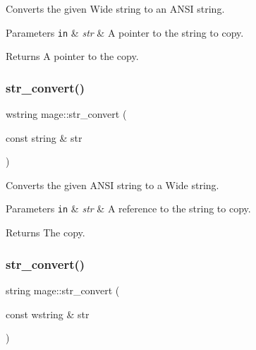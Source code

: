 Converts the given Wide string to an A\+N\+SI string.


\begin{DoxyParams}[1]{Parameters}
\mbox{\tt in}  & {\em str} & A pointer to the string to copy. \\
\hline
\end{DoxyParams}
\begin{DoxyReturn}{Returns}
A pointer to the copy. 
\end{DoxyReturn}
\hypertarget{namespacemage_a7ce8ba404dec8488d86012662043d5a1}{}\label{namespacemage_a7ce8ba404dec8488d86012662043d5a1} 
\subsubsection{\texorpdfstring{str\+\_\+convert()}{str\_convert()}\hspace{0.1cm}{\footnotesize\ttfamily [3/4]}}
{\footnotesize\ttfamily wstring mage\+::str\+\_\+convert (\begin{DoxyParamCaption}\item[{const string \&}]{str }\end{DoxyParamCaption})}

Converts the given A\+N\+SI string to a Wide string.


\begin{DoxyParams}[1]{Parameters}
\mbox{\tt in}  & {\em str} & A reference to the string to copy. \\
\hline
\end{DoxyParams}
\begin{DoxyReturn}{Returns}
The copy. 
\end{DoxyReturn}
\hypertarget{namespacemage_a3a36d9cbd56787862629cb013437217b}{}\label{namespacemage_a3a36d9cbd56787862629cb013437217b} 
\subsubsection{\texorpdfstring{str\+\_\+convert()}{str\_convert()}\hspace{0.1cm}{\footnotesize\ttfamily [4/4]}}
{\footnotesize\ttfamily string mage\+::str\+\_\+convert (\begin{DoxyParamCaption}\item[{const wstring \&}]{str }\end{DoxyParamCaption})}


